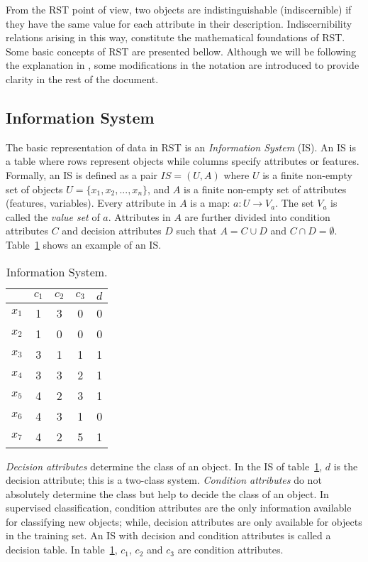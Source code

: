 \documentclass[citenumber]{llncs}
\begin{document}
  From the RST point of view, two objects are indistinguishable (indiscernible) if they have the same value for each attribute in their description. Indiscernibility relations arising in this way, constitute the mathematical foundations of RST. Some basic concepts of RST are presented bellow. Although we will be following the explanation in \cite{Polkowski00}, some modifications in the notation are introduced to provide clarity in the rest of the document.
  
\subsection{Information System}
  The basic representation of data in RST is an \emph{Information System} (IS). An IS is a table where rows represent objects while columns specify attributes or features. Formally, an IS is defined as a pair $IS=(U,A)$ where $U$ is a finite non-empty set of objects $U=\lbrace x_1,x_2,...,x_n\rbrace$, and $A$ is a finite non-empty set of attributes (features, variables). Every attribute in $A$ is a map: $a: U \rightarrow V_a$. The set $V_a$ is called the \textit{value set} of $a$. Attributes in $A$ are further divided into condition attributes $C$ and decision attributes $D$ such that $A=C \cup D$ and $C \cap D =\emptyset$.   Table~\ref{tab_IS} shows an example of an IS.
  
  
 \begin{table}[htb]
		\caption{Information System.} \label{tab_IS}
		\centering
 	\begin{tabular}{c||c|c|c||c}
 			  & $c_1$ & $c_2$ &  $c_3$ & $d$ \\
 		\hline \hline
		$x_1$ &   1   &    3  &  0  &   0   \\
		$x_2$ &   1   &    0  &  0  &   0   \\
		$x_3$ &   3   &    1  &  1  &   1   \\
		$x_4$ &   3   &    3  &  2  &   1   \\
		$x_5$ &   4   &    2  &  3  &   1   \\
		$x_6$ &   4   &    3  &  1  &   0   \\
		$x_7$ &   4   &    2  &  5  &   1   \\
 	\end{tabular}             
 \end{table}
 
   
  \textit{Decision attributes} determine the class of an object. In the IS of table~\ref{tab_IS}, $d$ is the decision attribute; this is a two-class system. \textit{Condition attributes} do not absolutely determine the class but help to decide the class of an object. In supervised classification, condition attributes are the only information available for classifying new objects; while, decision attributes are only available for objects in the training set. An IS with decision and condition attributes is called a decision table. In table~\ref{tab_IS}, $c_1$, $c_2$ and $c_3$ are condition attributes.
  
\end{document}
